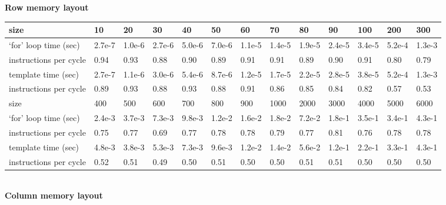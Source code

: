 \documentclass[a4paper,12pt]{article}
\begin{document}
\bf
Row memory layout\\
\rm

\begin{tabular}{|l|l|l|l|l|l|l|l|l|l|l|l|l|}
\hline
size & 10 & 20 & 30 & 40 & 50 & 60 & 70 & 80 & 90 & 100 & 200 & 300 \\
\hline
`for' loop time (sec) & 2.7e-7 & 1.0e-6 & 2.7e-6 & 5.0e-6 & 7.0e-6 & 1.1e-5 & 1.4e-5 &
1.9e-5 & 2.4e-5 & 3.4e-5 & 5.2e-4 & 1.3e-3 \\
instructions per cycle & 0.94 & 0.93 & 0.88 & 0.90 & 0.89 & 0.91 & 0.91 & 0.89 & 0.90 & 0.91 & 0.80 & 0.79\\
\hline
template time (sec) & 2.7e-7 & 1.1e-6 & 3.0e-6 & 5.4e-6 & 8.7e-6 & 1.2e-5 & 1.7e-5 &
2.2e-5 & 2.8e-5 & 3.8e-5 & 5.2e-4 & 1.3e-3 \\
instructions per cycle & 0.89 & 0.93 & 0.88 & 0.93 & 0.88 & 0.91 & 0.86 & 0.85 & 0.84 & 0.82 & 0.57 & 0.53\\
\hline
\hline
size & 400 & 500 & 600 & 700 & 800 & 900 & 1000 & 2000 & 3000 & 4000 & 5000 & 6000 \\
\hline
`for' loop time (sec) & 2.4e-3 & 3.7e-3 & 7.3e-3 & 9.8e-3 & 1.2e-2 & 1.6e-2 & 1.8e-2 &
7.2e-2 & 1.8e-1 & 3.5e-1 & 3.4e-1 & 4.3e-1 \\
instructions per cycle & 0.75 & 0.77 & 0.69 & 0.77 & 0.78 & 0.78 & 0.79 & 0.77 & 0.81 & 0.76 & 0.78 & 0.78 \\
\hline
template time (sec) & 4.8e-3 & 3.8e-3 & 5.3e-3 & 7.3e-3 & 9.6e-3 & 1.2e-2 & 1.4e-2 &
5.6e-2 & 1.2e-1 & 2.2e-1 & 3.3e-1 & 4.3e-1 \\
instructions per cycle & 0.52 & 0.51 & 0.49 & 0.50 & 0.51 & 0.50 & 0.50 & 0.51 & 0.51 & 0.50 & 0.50 & 0.50 \\
\hline
\end{tabular}\\

\vspace{1cm}
\bf
Column memory layout\\
\rm
\end{document}
